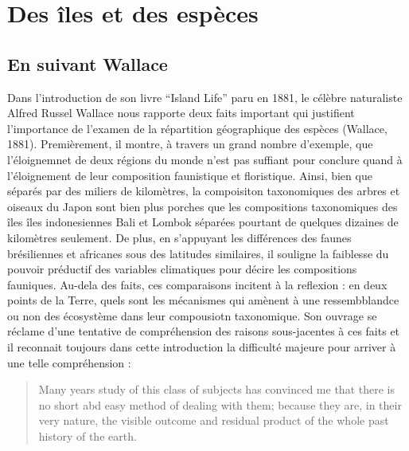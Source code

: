 \section*{Des îles et des espèces}\label{des-uxeeles-et-des-espuxe8ces}

\subsection*{En suivant Wallace}\label{en-suivant-wallace}

Dans l'introduction de son livre ``Island Life'' paru en 1881, le
célèbre naturaliste Alfred Russel Wallace nous rapporte deux faits
important qui justifient l'importance de l'examen de la répartition
géographique des espèces (Wallace, 1881). Premièrement, il montre, à
travers un grand nombre d'exemple, que l'éloignemnet de deux régions du
monde n'est pas suffiant pour conclure quand à l'éloignement de leur
composition faunistique et floristique. Ainsi, bien que séparés par des
miliers de kilomètres, la compoisiton taxonomiques des arbres et oiseaux
du Japon sont bien plus porches que les compositions taxonomiques des
îles îles indonesiennes Bali et Lombok séparées pourtant de quelques
dizaines de kilomètres seulement. De plus, en s'appuyant les différences
des faunes brésiliennes et africanes sous des latitudes similaires, il
souligne la faiblesse du pouvoir préductif des variables climatiques
pour décire les compositions fauniques. Au-dela des faits, ces
comparaisons incitent à la reflexion : en deux points de la Terre, quels
sont les mécanismes qui amènent à une ressembblandce ou non des
écosystème dans leur compousiotn taxonomique. Son ouvrage se réclame
d'une tentative de compréhension des raisons sous-jacentes à ces faits
et il reconnait toujours dans cette introduction la difficulté majeure
pour arriver à une telle compréhension :

\begin{quote}
\guillemotleft Many years study of this class of subjects has convinced
me that there is no short abd easy method of dealing with them; because
they are, in their very nature, the visible outcome and residual product
of the whole past history of the earth. \guillemotright
\end{quote}

